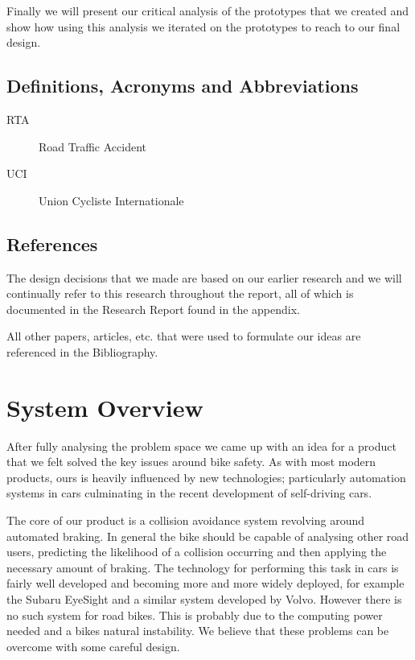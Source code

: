 \documentclass[a4paper]{report}
\begin{document}
Finally we will present our critical analysis of the prototypes that we created and show how using this analysis we iterated on the prototypes to reach to our final design.

\section{Definitions, Acronyms and Abbreviations}
\begin{description}
\item[RTA] Road Traffic Accident
\item[UCI] Union Cycliste Internationale
\end{description}
\section{References}
The design decisions that we made are based on our earlier research and we will continually refer to this research throughout the report, all of which is documented in the Research Report found in the appendix. 

All other papers, articles, etc. that were used to formulate our ideas are referenced in the Bibliography.

\chapter{System Overview}
After fully analysing the problem space we came up with an idea for a product that we felt solved the key issues around bike safety. As with most modern products, ours is heavily influenced by new technologies; particularly automation systems in cars culminating in the recent development of self-driving cars. %

The core of our product is a collision avoidance system revolving around automated braking. In general the bike should be capable of analysing other road users, predicting the likelihood of a collision occurring and then applying the necessary amount of braking. The technology for performing this task in cars is fairly well developed and becoming more and more widely deployed, for example the Subaru EyeSight\cite{eyesight} and a similar system developed by Volvo\cite{volvo}. However there is no such system for road bikes. This is probably due to the computing power needed and a bikes natural instability. We believe that these problems can be overcome with some careful design.
\end{document}
